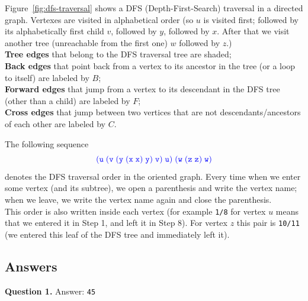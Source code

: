 \documentclass[jou]{apa6}
\begin{document}
Figure~\ref{fig:dfs-traversal} shows a DFS (Depth-First-Search) traversal
in a directed graph. Vertexes are visited in alphabetical order 
(so $u$ is visited first; followed by its alphabetically first 
child $v$, followed by $y$, followed by $x$. After that
we visit another tree (unreachable from the first one) \textendash{}
$w$ followed by $z$.)\\
{\bf Tree edges} that belong to the DFS traversal tree are shaded;\\
{\bf Back edges} that point back from a vertex to its ancestor in the tree (or a loop to itself)
are labeled by $B$;\\
{\bf Forward edges} that jump from a vertex to its descendant in the DFS tree (other than a child) are
labeled by $F$;\\
{\bf Cross edges} that jump between two vertices that are not descendants/ancestors of 
each other are labeled by $C$.

The following sequence
\begin{equation} \label{eq:dfs-search-order}
\textcolor{blue}{\mathtt{(u\;(v\;(y\;(x\;x)\;y)\;v)\;u)\;(w\;(z\;z)\;w)}}
\end{equation}
denotes the DFS traversal order in the oriented graph. 
Every time when we enter some vertex (and its subtree), 
we open a parenthesis and write the vertex name; when we leave, 
we write the vertex name again and close the parenthesis.\\
This order is also written inside each vertex (for example {\tt 1/8} 
for vertex $u$ means that we entered it in Step 1, and left it in 
Step 8). For vertex $z$ this pair is {\tt 10/11} (we entered this leaf
of the DFS tree and immediately left it).




\newpage
\subsection{Answers}

\vspace{4pt}
{\bf Question 1.} Answer: {\tt 45} \\
\end{document}
